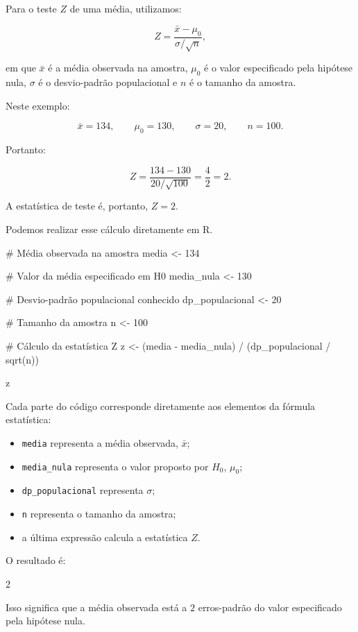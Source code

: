 Para o teste $Z$ de uma média, utilizamos:

\[
Z=
\frac{\bar{x}-\mu_0}
{\sigma/\sqrt{n}},
\]

em que $\bar{x}$ é a média observada na amostra, $\mu_0$ é o valor especificado
pela hipótese nula, $\sigma$ é o desvio-padrão populacional e $n$ é o tamanho
da amostra.

Neste exemplo:

\[
\bar{x}=134,\qquad
\mu_0=130,\qquad
\sigma=20,\qquad
n=100.
\]

Portanto:

\[
Z=
\frac{134-130}{20/\sqrt{100}}
=
\frac{4}{2}
=
2.
\]

A estatística de teste é, portanto, $Z=2$.

Podemos realizar esse cálculo diretamente em R.

\begin{code}
# Média observada na amostra
media <- 134

# Valor da média especificado em H0
media_nula <- 130

# Desvio-padrão populacional conhecido
dp_populacional <- 20

# Tamanho da amostra
n <- 100

# Cálculo da estatística Z
z <- (media - media_nula) /
  (dp_populacional / sqrt(n))

z
\end{code}

Cada parte do código corresponde diretamente aos elementos da fórmula
estatística:

\begin{itemize}
    \item \texttt{media} representa a média observada, $\bar{x}$;
    \item \texttt{media\_nula} representa o valor proposto por $H_0$, $\mu_0$;
    \item \texttt{dp\_populacional} representa $\sigma$;
    \item \texttt{n} representa o tamanho da amostra;
    \item a última expressão calcula a estatística $Z$.
\end{itemize}

O resultado é:

\begin{code} 2
\end{code}

Isso significa que a média observada está a $2$ erros-padrão do valor
especificado pela hipótese nula.

